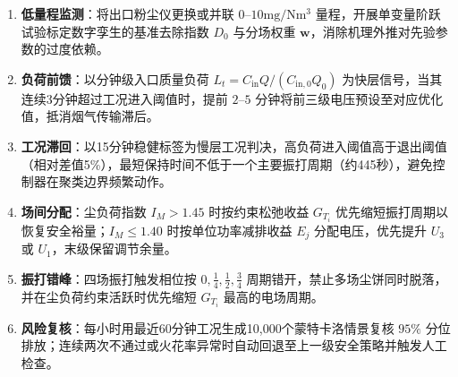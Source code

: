 \begin{enumerate}
    \item \textbf{低量程监测}：将出口粉尘仪更换或并联 $0\text{--}10\mathrm{mg/Nm^3}$ 量程，开展单变量阶跃试验标定数字孪生的基准去除指数 $D_0$ 与分场权重 $\pmb{w}$，消除机理外推对先验参数的过度依赖。
    
    \item \textbf{负荷前馈}：以分钟级入口质量负荷 $L_t=C_{\mathrm{in}}Q/(C_{\mathrm{in},0}Q_0)$ 为快层信号，当其连续3分钟超过工况进入阈值时，提前 $2\text{--}5$ 分钟将前三级电压预设至对应优化值，抵消烟气传输滞后。
    
    \item \textbf{工况滞回}：以15分钟稳健标签为慢层工况判决，高负荷进入阈值高于退出阈值（相对差值5\%），最短保持时间不低于一个主要振打周期（约445秒），避免控制器在聚类边界频繁动作。
    
    \item \textbf{场间分配}：尘负荷指数 $I_M>1.45$ 时按约束松弛收益 $G_{T_i}$ 优先缩短振打周期以恢复安全裕量；$I_M\leq 1.40$ 时按单位功率减排收益 $E_j$ 分配电压，优先提升 $U_3$ 或 $U_1$，末级保留调节余量。
    
    \item \textbf{振打错峰}：四场振打触发相位按 $0,\frac{1}{4},\frac{1}{2},\frac{3}{4}$ 周期错开，禁止多场尘饼同时脱落，并在尘负荷约束活跃时优先缩短 $G_{T_i}$ 最高的电场周期。
    
    \item \textbf{风险复核}：每小时用最近60分钟工况生成10,000个蒙特卡洛情景复核 $95\%$ 分位排放；连续两次不通过或火花率异常时自动回退至上一级安全策略并触发人工检查。
\end{enumerate}